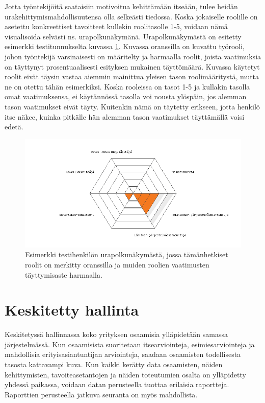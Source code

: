 \documentclass[a4paper,finnish,12pt]{article}
\begin{document}
Jotta työntekijöitä saataisiin motivoitua kehittämään itseään, tulee heidän urakehittymismahdollisuutensa olla selkeästi tiedossa. Koska jokaiselle roolille on asetettu konkreettiset tavoitteet kullekin roolitasolle 1-5, voidaan nämä visualisoida selvästi ns. urapolkunäkymänä. Urapolkunäkymästä on esitetty esimerkki testitunnukselta kuvassa \ref{fig:urapolkuspiderweb}. Kuvassa oranssilla on kuvattu työrooli, johon työntekijä varsinaisesti on määritelty ja harmaalla roolit, joista vaatimuksia on täyttynyt prosentuaalisesti esityksen mukainen täyttömäärä. Kuvassa käytetyt roolit eivät täysin vastaa aiemmin mainittua yleisen tason roolimääritystä, mutta ne on otettu tähän esimerkiksi. Koska rooleissa on tasot 1-5 ja kullakin tasolla omat vaatimuksensa, ei käytännössä tasolla voi nousta ylöspäin, jos alemman tason vaatimukset eivät täyty. Kuitenkin nämä on täytetty erikseen, jotta henkilö itse näkee, kuinka pitkälle hän alemman tason vaatimukset täyttämällä voisi edetä.

\begin{figure}[ht]
\centering
\includegraphics[width=1\textwidth]{urapolkuPlot_tst_usr.png}
\caption{Esimerkki testihenkilön urapolkunäkymästä, jossa tämänhetkiset roolit on merkitty oranssilla ja muiden roolien vaatimusten täyttymisaste harmaalla.}
\label{fig:urapolkuspiderweb}
\end{figure}

\clearpage

\section{Keskitetty hallinta}

Keskitetyssä hallinnassa koko yrityksen osaamisia ylläpidetään samassa järjestelmässä. Kun osaamisista suoritetaan itsearviointeja, esimiesarviointeja ja mahdollisia erityisasiantuntijan arviointeja, saadaan osaamisten todellisesta tasosta kattavampi kuva. Kun kaikki kerätty data osaamisten, näiden kehittymisten, tavoiteasetantojen ja näiden toteutumien osalta on ylläpidetty yhdessä paikassa, voidaan datan perusteella tuottaa erilaisia raportteja. Raporttien perusteella jatkuva seuranta on myös mahdollista. 
\end{document}
